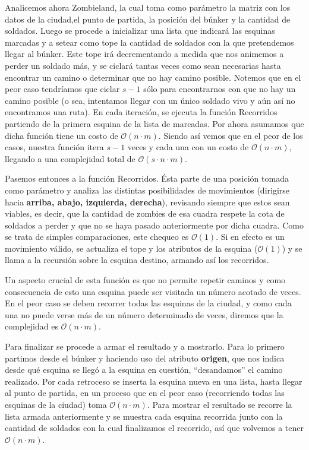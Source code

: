 Analicemos ahora {\sc Zombieland}, la cual toma como parámetro la matriz con los datos de la ciudad,el punto de partida, la posición del búnker y la cantidad de soldados. Luego se procede a inicializar una lista que indicará las esquinas marcadas y a setear como tope la cantidad de soldados con la que pretendemos llegar al búnker. Este tope irá decrementando a medida que nos animemos a perder un soldado más, y se ciclará tantas veces como sean necesarias hasta encontrar un camino o determinar que no hay camino posible. Notemos que en el peor caso tendríamos que ciclar $s-1$ sólo para encontrarnos con que no hay un camino posible (o sea, intentamos llegar con un único soldado vivo y aún así no encontramos una ruta). En cada iteración, se ejecuta la función {\sc Recorridos} partiendo de la primera esquina de la lista de marcadas. Por ahora asumamos que dicha función tiene un costo de $\mathcal{O}(n \cdot m)$. Siendo así vemos que en el peor de los casos, nuestra función itera $s-1$ veces y cada una con un costo de $\mathcal{O}(n \cdot m)$, llegando a una complejidad total de $\mathcal{O}(s \cdot n \cdot m)$.

Pasemos entonces a la función {\sc Recorridos}. Ésta parte de una posición tomada como parámetro y analiza las distintas posibilidades de movimientos (dirigirse hacia {\bf arriba, abajo, izquierda, derecha}), revisando siempre que estos sean viables, es decir, que la cantidad de zombies de esa cuadra respete la cota de soldados a perder y que no se haya pasado anteriormente por dicha cuadra. Como se trata de simples comparaciones, este chequeo es $\mathcal{O}(1)$. Si en efecto es un movimiento válido, se actualiza el tope y los atributos de la esquina ($\mathcal{O}(1)$) y se llama a la recursión sobre la esquina destino, armando así los recorridos.

Un aspecto crucial de esta función es que no permite repetir caminos y como consecuencia de esto una esquina puede ser visitada un número acotado de veces. En el peor caso se deben recorrer todas las esquinas de la ciudad, y como cada una no puede verse más de un número determinado de veces, diremos que la complejidad es $\mathcal{O}(n \cdot m)$.

Para finalizar se procede a armar el resultado y a mostrarlo. Para lo primero partimos desde el búnker y haciendo uso del atributo {\bf origen}, que nos indica desde qué esquina se llegó a la esquina en cuestión, ``desandamos'' el camino realizado. Por cada retroceso se inserta la esquina nueva en una lista, hasta llegar al punto de partida, en un proceso que en el peor caso (recorriendo todas las esquinas de la ciudad) toma $\mathcal{O}(n \cdot m)$. Para mostrar el resultado se recorre la lista armada anteriormente y se muestra cada esquina recorrida junto con la cantidad de soldados con la cual finalizamos el recorrido, así que volvemos a tener $\mathcal{O}(n \cdot m)$.

